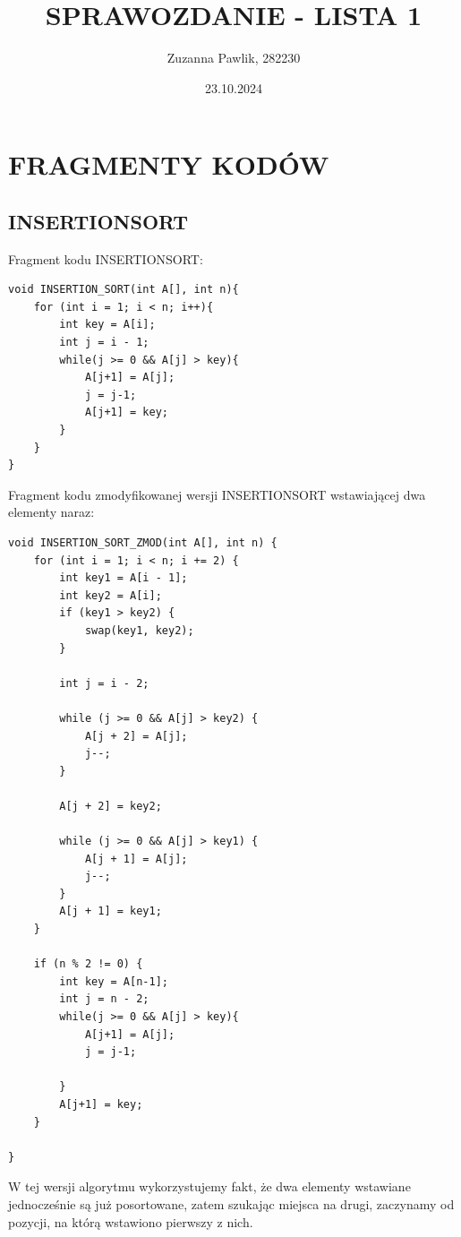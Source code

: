 \documentclass{article}
\title{SPRAWOZDANIE - LISTA 1}
\author{Zuzanna Pawlik, 282230}
\date{23.10.2024}
\begin{document}
\maketitle

\section*{FRAGMENTY KODÓW}
\subsection*{INSERTIONSORT}
Fragment kodu INSERTIONSORT:
\begin{verbatim}
void INSERTION_SORT(int A[], int n){
	for (int i = 1; i < n; i++){
		int key = A[i];
		int j = i - 1;
		while(j >= 0 && A[j] > key){
			A[j+1] = A[j];
			j = j-1;
			A[j+1] = key;
		}
	}
}
\end{verbatim}
Fragment kodu zmodyfikowanej wersji INSERTIONSORT wstawiającej dwa elementy naraz:
\begin{verbatim}
void INSERTION_SORT_ZMOD(int A[], int n) {
	for (int i = 1; i < n; i += 2) {
		int key1 = A[i - 1];
		int key2 = A[i];
		if (key1 > key2) {
			swap(key1, key2);
		}
		
		int j = i - 2;
		
		while (j >= 0 && A[j] > key2) {
			A[j + 2] = A[j];
			j--;
		}
		
		A[j + 2] = key2;
		
		while (j >= 0 && A[j] > key1) {
			A[j + 1] = A[j];
			j--;
		}
		A[j + 1] = key1;
	}
	
	if (n % 2 != 0) {
		int key = A[n-1];
		int j = n - 2;
		while(j >= 0 && A[j] > key){
			A[j+1] = A[j];
			j = j-1;
			
		}
		A[j+1] = key;
	}
	
}
\end{verbatim}
W tej wersji algorytmu wykorzystujemy fakt, że dwa elementy wstawiane jednocześnie są już posortowane, zatem szukając miejsca na drugi, zaczynamy od pozycji, na którą wstawiono pierwszy z nich.
\end{document}

